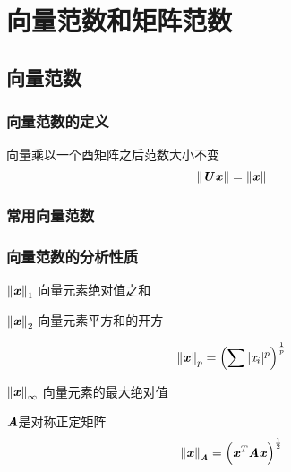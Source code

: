 \chapter{向量范数和矩阵范数}
\label{cha:向量范数和矩阵范数}



\section{向量范数}
\label{sec:向量范数}

\subsection{向量范数的定义}
\label{sub:向量范数的定义}

\begin{definition}[向量范数是酉不变的]
    向量乘以一个酉矩阵之后范数大小不变
    \[
        \left\lVert\boldsymbol{\mathit{U}}\boldsymbol{\mathit{x}}\right\rVert = \left\lVert\boldsymbol{\mathit{x}}\right\rVert
    \]
\end{definition}

\subsection{常用向量范数}
\label{sub:常用向量范数}

\subsection{向量范数的分析性质}
\label{sub:向量范数的分析性质}

\begin{definition}[1-范数或$l_1$范数]
    $\left\lVert\boldsymbol{\mathit{x}}\right\rVert_1$ \quad 向量元素绝对值之和
\end{definition}

\begin{definition}[2-范数或$l_2$范数]
    $\left\lVert\boldsymbol{\mathit{x}}\right\rVert_2$ \quad 向量元素平方和的开方
\end{definition}


\begin{definition}[p-范数或$l_p$范数]
    $$
    \left\lVert\boldsymbol{\mathit{x}}\right\rVert_p = \left( \sum |\mathit{x}_i|^p \right)^{\frac{1}{p}}
    $$
\end{definition}

\begin{definition}
    $\left\lVert\boldsymbol{\mathit{x}}\right\rVert_{\infty}$ 向量元素的最大绝对值
\end{definition}

\begin{definition}
    $\boldsymbol{\mathit{A}}$是对称正定矩阵
    $$
    \left\lVert\boldsymbol{\mathit{x}}\right\rVert_{\boldsymbol{\mathit{A}}} = \left( \boldsymbol{\mathit{x}}^T\boldsymbol{\mathit{A}}\boldsymbol{\mathit{x}} \right)^{\frac{1}{2}}
    $$
\end{definition}

